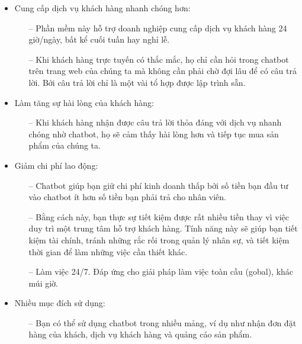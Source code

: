 \begin{itemize}
    \item Cung cấp dịch vụ khách hàng nhanh chóng hơn:
          \begin{itemize}
              \item[--] Phần mềm này hỗ trợ doanh nghiệp cung cấp dịch vụ khách hàng 24 giờ/ngày, bất kể cuối tuần hay nghỉ lễ.
              \item[--] Khi khách hàng trực tuyến có thắc mắc, họ chỉ cần hỏi trong chatbot trên trang web của chúng ta mà không cần phải chờ đợi lâu để có câu trả lời. Bởi câu trả lời chỉ là một vài tổ hợp được lập trình sẵn.
          \end{itemize}
    \item Làm tăng sự hài lòng của khách hàng:
          \begin{itemize}
              \item[--] Khi khách hàng nhận được câu trả lời thỏa đáng với dịch vụ nhanh chóng nhờ chatbot, họ sẽ cảm thấy hài lòng hơn và tiếp tục mua sản phẩm của chúng ta.
          \end{itemize}
    \item Giảm chi phí lao động:
          \begin{itemize}
              \item[--] Chatbot giúp bạn giữ chi phí kinh doanh thấp bởi số tiền bạn đầu tư vào chatbot ít hơn số tiền bạn phải trả cho nhân viên.
              \item[--] Bằng cách này, bạn thực sự tiết kiệm được rất nhiều tiền thay vì việc duy trì một trung tâm hỗ trợ khách hàng. Tính năng này sẽ giúp bạn tiết kiệm tài chính, tránh những rắc rối trong quản lý nhân sự, và tiết kiệm thời gian để làm những việc cần thiết khác.
              \item[--] Làm việc 24/7. Đáp ứng cho giải pháp làm việc toàn cầu (gobal), khác múi giờ. 
          \end{itemize}
    \item Nhiều mục đích sử dụng:
          \begin{itemize}
              \item[--] Bạn có thể sử dụng chatbot trong nhiều mảng, ví dụ như nhận đơn đặt hàng của khách, dịch vụ khách hàng và quảng cáo sản phẩm.
          \end{itemize}
\end{itemize}
